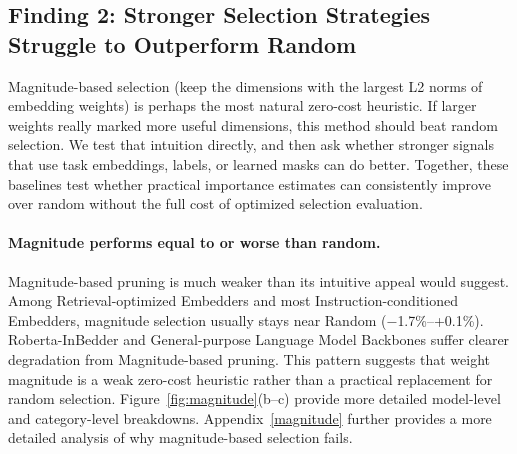 \documentclass[11pt,a4paper]{article}
\begin{document}
\subsection{Finding 2: Stronger Selection Strategies Struggle to Outperform Random}

Magnitude-based selection (keep the dimensions with the largest L2 norms of embedding weights) is perhaps the most natural zero-cost heuristic. If larger weights really marked more useful dimensions, this method should beat random selection. We test that intuition directly, and then ask whether stronger signals that use task embeddings, labels, or learned masks can do better. Together, these baselines test whether practical importance estimates can consistently improve over random without the full cost of optimized selection evaluation.

\paragraph{Magnitude performs equal to or worse than random.}
Magnitude-based pruning is much weaker than its intuitive appeal would suggest. Among Retrieval-optimized Embedders and most Instruction-conditioned Embedders, magnitude selection usually stays near Random ($-$1.7\%--+0.1\%). Roberta-InBedder and General-purpose Language Model Backbones suffer clearer degradation from Magnitude-based pruning. This pattern suggests that weight magnitude is a weak zero-cost heuristic rather than a practical replacement for random selection. Figure~\ref{fig:magnitude}(b--c) provide more detailed model-level and category-level breakdowns. Appendix~\ref{magnitude} further provides a more detailed analysis of why magnitude-based selection fails.
\end{document}
